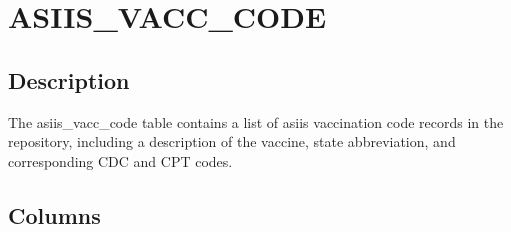 \documentclass[
  letterpaper,
  DIV=11,
  numbers=noendperiod]{scrreprt}
\begin{document}
\hypertarget{asiis_vacc_code}{%
\chapter*{ASIIS\_VACC\_CODE}\label{asiis_vacc_code}}

\hypertarget{description-2}{%
\section*{Description}\label{description-2}}

The asiis\_vacc\_code table contains a list of asiis vaccination code
records in the repository, including a description of the vaccine, state
abbreviation, and corresponding CDC and CPT codes.

\hypertarget{columns-2}{%
\section*{Columns}\label{columns-2}}
\end{document}
